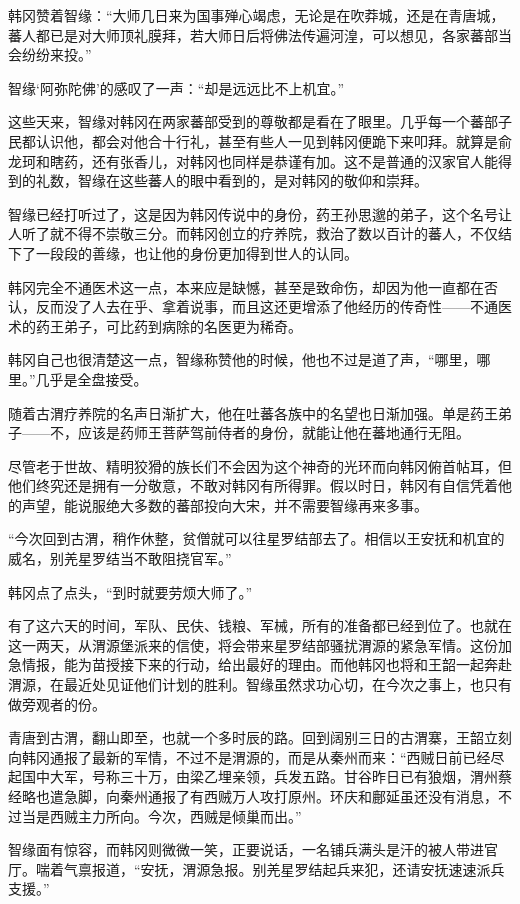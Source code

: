 韩冈赞着智缘：“大师几日来为国事殚心竭虑，无论是在吹莽城，还是在青唐城，蕃人都已是对大师顶礼膜拜，若大师日后将佛法传遍河湟，可以想见，各家蕃部当会纷纷来投。”

智缘‘阿弥陀佛’的感叹了一声：“却是远远比不上机宜。”

这些天来，智缘对韩冈在两家蕃部受到的尊敬都是看在了眼里。几乎每一个蕃部子民都认识他，都会对他合十行礼，甚至有些人一见到韩冈便跪下来叩拜。就算是俞龙珂和瞎药，还有张香儿，对韩冈也同样是恭谨有加。这不是普通的汉家官人能得到的礼数，智缘在这些蕃人的眼中看到的，是对韩冈的敬仰和崇拜。

智缘已经打听过了，这是因为韩冈传说中的身份，药王孙思邈的弟子，这个名号让人听了就不得不崇敬三分。而韩冈创立的疗养院，救治了数以百计的蕃人，不仅结下了一段段的善缘，也让他的身份更加得到世人的认同。

韩冈完全不通医术这一点，本来应是缺憾，甚至是致命伤，却因为他一直都在否认，反而没了人去在乎、拿着说事，而且这还更增添了他经历的传奇性——不通医术的药王弟子，可比药到病除的名医更为稀奇。

韩冈自己也很清楚这一点，智缘称赞他的时候，他也不过是道了声，“哪里，哪里。”几乎是全盘接受。

随着古渭疗养院的名声日渐扩大，他在吐蕃各族中的名望也日渐加强。单是药王弟子——不，应该是药师王菩萨驾前侍者的身份，就能让他在蕃地通行无阻。

尽管老于世故、精明狡猾的族长们不会因为这个神奇的光环而向韩冈俯首帖耳，但他们终究还是拥有一分敬意，不敢对韩冈有所得罪。假以时日，韩冈有自信凭着他的声望，能说服绝大多数的蕃部投向大宋，并不需要智缘再来多事。

“今次回到古渭，稍作休整，贫僧就可以往星罗结部去了。相信以王安抚和机宜的威名，别羌星罗结当不敢阻挠官军。”

韩冈点了点头，“到时就要劳烦大师了。”

有了这六天的时间，军队、民伕、钱粮、军械，所有的准备都已经到位了。也就在这一两天，从渭源堡派来的信使，将会带来星罗结部骚扰渭源的紧急军情。这份加急情报，能为苗授接下来的行动，给出最好的理由。而他韩冈也将和王韶一起奔赴渭源，在最近处见证他们计划的胜利。智缘虽然求功心切，在今次之事上，也只有做旁观者的份。

青唐到古渭，翻山即至，也就一个多时辰的路。回到阔别三日的古渭寨，王韶立刻向韩冈通报了最新的军情，不过不是渭源的，而是从秦州而来：“西贼日前已经尽起国中大军，号称三十万，由梁乙埋亲领，兵发五路。甘谷昨日已有狼烟，渭州蔡经略也遣急脚，向秦州通报了有西贼万人攻打原州。环庆和鄜延虽还没有消息，不过当是西贼主力所向。今次，西贼是倾巢而出。”

智缘面有惊容，而韩冈则微微一笑，正要说话，一名铺兵满头是汗的被人带进官厅。喘着气禀报道，“安抚，渭源急报。别羌星罗结起兵来犯，还请安抚速速派兵支援。”

